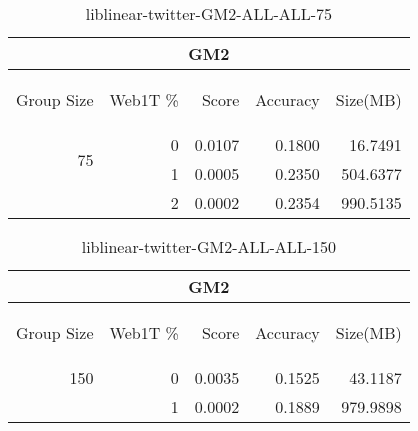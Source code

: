 \begin{center}
\begin{table}[htbp] 
 \begin{center}
\begin{tabular}{ | r | r | r | r | r |}
\hline
\multicolumn{5}{|c|}{GM2}\\
\hline
\begin{sideways}Group Size\end{sideways} & \begin{sideways}Web1T \%\end{sideways} & \begin{sideways}Score\end{sideways} & \begin{sideways}Accuracy\end{sideways} & \begin{sideways}Size(MB)\end{sideways}\\
\hline
\multirow{2}{*}{75}
 & 0 & 0.0107 & 0.1800 & 16.7491\\ \cline{2-5}
 & 1 & 0.0005 & 0.2350 & 504.6377\\ \cline{2-5}
 & 2 & 0.0002 & 0.2354 & 990.5135\\ \cline{2-5}
\hline
\end{tabular}
\caption{liblinear-twitter-GM2-ALL-ALL-75}
\label{table:liblinear-twitter-GM2-ALL-ALL-75}
\end{center}
 \end{table}
\end{center}

\begin{center}
\begin{table}[htbp] 
 \begin{center}
\begin{tabular}{ | r | r | r | r | r |}
\hline
\multicolumn{5}{|c|}{GM2}\\
\hline
\begin{sideways}Group Size\end{sideways} & \begin{sideways}Web1T \%\end{sideways} & \begin{sideways}Score\end{sideways} & \begin{sideways}Accuracy\end{sideways} & \begin{sideways}Size(MB)\end{sideways}\\
\hline
\multirow{1}{*}{150}
 & 0 & 0.0035 & 0.1525 & 43.1187\\ \cline{2-5}
 & 1 & 0.0002 & 0.1889 & 979.9898\\ \cline{2-5}
\hline
\end{tabular}
\caption{liblinear-twitter-GM2-ALL-ALL-150}
\label{table:liblinear-twitter-GM2-ALL-ALL-150}
\end{center}
 \end{table}
\end{center}

